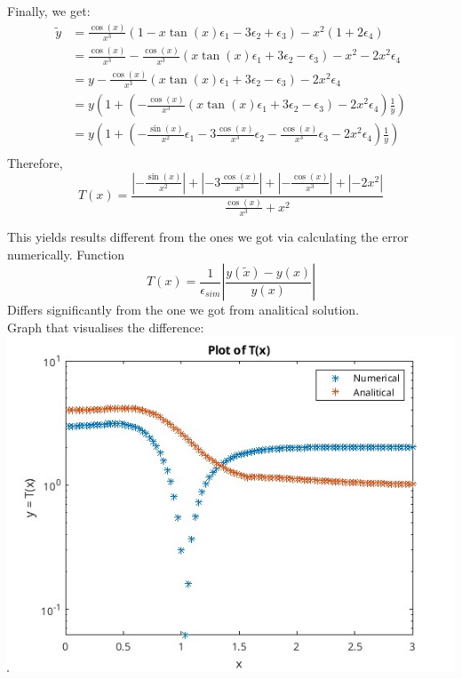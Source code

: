 \documentclass[11pt]{article}
\begin{document}
Finally, we get:
\begin{align*}
\tilde{y}&=\frac{\cos(x)}{x^3}(1 - x\tan(x) \epsilon_1 - 3\epsilon_2 + \epsilon_3)-x^2(1+2\epsilon_4)\\
    &=\frac{\cos(x)}{x^3}-\frac{\cos(x)}{x^3}(x\tan(x) \epsilon_1 + 3\epsilon_2 - \epsilon_3)-x^2-2x^2\epsilon_4 \\
    &=y-\frac{\cos(x)}{x^3}(x\tan(x) \epsilon_1 + 3\epsilon_2 - \epsilon_3)-2x^2\epsilon_4\\
    &=y(1 + (-\frac{\cos(x)}{x^3}(x\tan(x) \epsilon_1 + 3\epsilon_2 - \epsilon_3)-2x^2\epsilon_4)\frac1y)\\
    &=y(1 + (-\frac{\sin(x)}{x^2}\epsilon_1 - 3\frac{\cos(x)}{x^3}\epsilon_2 -\frac{\cos(x)}{x^3}\epsilon_3-2x^2\epsilon_4)\frac1y)\\
\end{align*}
Therefore, 
$$T(x) = \displaystyle\frac{\left|-\frac{\sin(x)}{x^2}\right| + \left|- 3\frac{\cos(x)}{x^3}\right| +\left|-\frac{\cos(x)}{x^3}\right| + \left|-2x^2\right|}{\frac{\cos(x)}{x^3} + x^2}$$

This yields results different from the ones we got via calculating the error numerically.
Function $$T(x) = \frac{1}{\epsilon_{sim}}\left| \displaystyle\frac{y(\tilde{x}) - y(x)}{y(x)} \right|$$
Differs significantly from the one we got from analitical solution.\\
Graph that visualises the difference:\\
\includegraphics[width=\textwidth]{Task1.jpg}

\pagebreak
\end{document}
